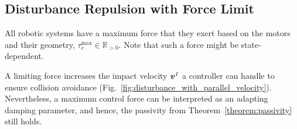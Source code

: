 
\subsection{Disturbance Repulsion with Force Limit}
All robotic systems have a maximum force that they  exert based on the motors and their geometry, $\tau_c^{\mathrm{max}} \in \mathbb{R}_{>0}$. Note that such a force might be state-dependent.

A limiting force increases the impact velocity $\boldsymbol{v}^I$ a controller can handle to ensure collision avoidance (Fig.~\ref{fig:disturbance_with_parallel_velocity}). Nevertheless, a maximum control force can be interpreted as an adapting damping parameter, and hence, the passivity from Theorem~\ref{theorem:passivity} still holds.


